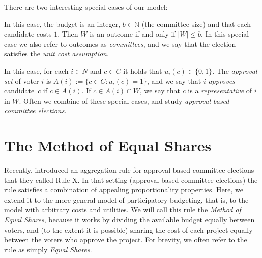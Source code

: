\documentclass[10pt]{scrartcl}
\renewcommand*{\leq}{\leqslant}
\newcommand{\myemph}[1]{{\color{winered}\emph{#1}}}
\newcommand{\naturals}{{{\mathbb{N}}}}
\theoremstyle{definition}
\theoremstyle{plain}
\renewenvironment{description}
{\list{}{\labelwidth=10pt \leftmargin=15pt
		\let\makelabel\descriptionlabel}}
{\endlist}
\begin{document}
There are two interesting special cases of our model:
\begin{description}
	\item[Committee elections.] In this case, the budget is an integer, $b \in \naturals$ (the committee size) and that each candidate costs $1$. Then $W$ is an outcome if and only if  $|W| \leq b$. In this special case we also refer to outcomes as \emph{committees}, and we say that the election satisfies the \myemph{unit cost assumption}.
	\item[Approval utilities.] In this case, for each $i \in N$ and $c \in C$ it holds that $u_i(c) \in \{0,1\}$. The \emph{approval set} of voter $i$ is $A(i):=\{c\in C\colon u_i(c) = 1\}$, and we say that $i$ \emph{approves} candidate~$c$ if $c \in A(i)$. If $c \in A(i) \cap W$, we say that $c$ is a \emph{representative} of $i$ in $W$.
\end{description}
Often we combine of these special cases, and study \myemph{approval-based committee elections}.

\section{The Method of Equal Shares}\label{sec:rulex}

Recently, \citet{pet-sko:laminar} introduced an aggregation rule  for approval-based committee elections that they called Rule X. In that setting (approval-based committee elections) the rule satisfies a combination of appealing proportionality properties. Here, we extend it to the more general model of participatory budgeting, that is, to the model with arbitrary costs and utilities.  We will call this rule the \emph{Method of Equal Shares}, because it works by dividing the available budget equally between voters, and (to the extent it is possible) sharing the cost of each project equally between the voters who approve the project. For brevity, we often refer to the rule as simply \emph{Equal Shares}.
\end{document}
